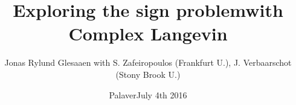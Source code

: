 



\title{Exploring the sign problem\newline{}with Complex Langevin}
\author{\texorpdfstring{%
    Jonas Rylund Glesaaen\newline{}%
    \fontsize{12pt}{12pt}\selectfont%
    with S. Zafeiropoulos (Frankfurt U.),\newline{}%
    \hphantom{with } J. Verbaarschot (Stony Brook U.)
  }{%
    Jonas Rylund Glesaaen}}
\date{\fontsize{16pt}{16pt}\selectfont{}Palaver\newline{}July 4th 2016}



\begin{frame}[plain]
\titlepage
\end{frame}

\begin{frame}[plain]
  \tableofcontents
\end{frame}

\setcounter{framenumber}{0}







